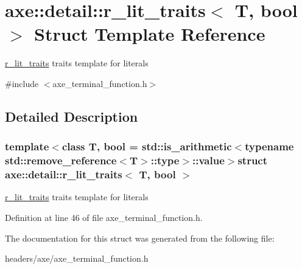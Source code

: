 \hypertarget{structaxe_1_1detail_1_1r__lit__traits}{\section{axe\+:\+:detail\+:\+:r\+\_\+lit\+\_\+traits$<$ T, bool $>$ Struct Template Reference}
\label{structaxe_1_1detail_1_1r__lit__traits}
}


\hyperlink{structaxe_1_1detail_1_1r__lit__traits}{r\+\_\+lit\+\_\+traits} traits template for literals  




{\ttfamily \#include $<$axe\+\_\+terminal\+\_\+function.\+h$>$}



\subsection{Detailed Description}
\subsubsection*{template$<$class T, bool = std\+::is\+\_\+arithmetic$<$typename std\+::remove\+\_\+reference$<$\+T$>$\+::type$>$\+::value$>$struct axe\+::detail\+::r\+\_\+lit\+\_\+traits$<$ T, bool $>$}

\hyperlink{structaxe_1_1detail_1_1r__lit__traits}{r\+\_\+lit\+\_\+traits} traits template for literals 

Definition at line 46 of file axe\+\_\+terminal\+\_\+function.\+h.



The documentation for this struct was generated from the following file\+:\begin{DoxyCompactItemize}
\item 
headers/axe/axe\+\_\+terminal\+\_\+function.\+h\end{DoxyCompactItemize}
